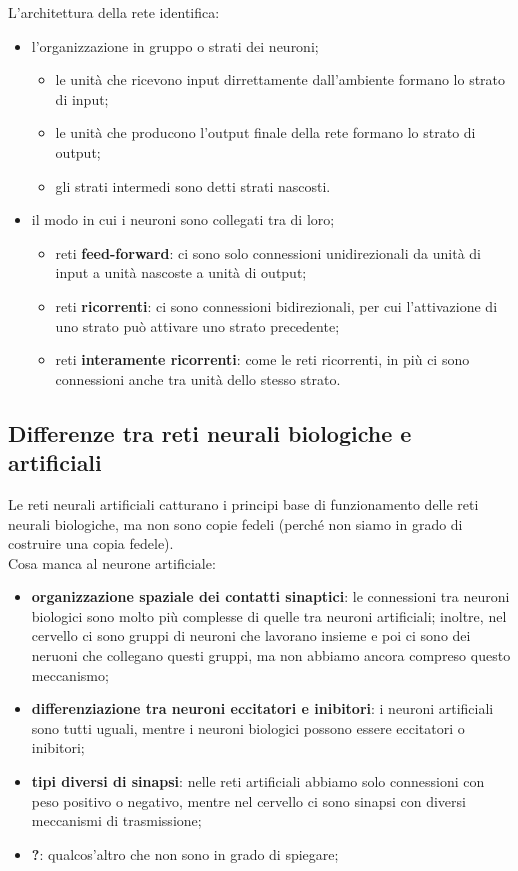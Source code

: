 L'architettura della rete identifica:
\begin{itemize}
\item l'organizzazione in gruppo o strati dei neuroni;
	\begin{itemize}
		\item le unità che ricevono input dirrettamente dall'ambiente formano lo strato
		di input;
		\item le unità che producono l'output finale della rete formano lo strato di
		output;
		\item gli strati intermedi sono detti strati nascosti.
	\end{itemize}
\item il modo in cui i neuroni sono collegati tra di loro;
	\begin{itemize}
		\item reti \textbf{feed-forward}: ci sono solo connessioni 
				unidirezionali da unità di
		input a unità nascoste a unità di output;

		\item reti \textbf{ricorrenti}: ci sono connessioni bidirezionali, per 
			cui l'attivazione di uno strato può attivare uno strato precedente;

		\item reti \textbf{interamente ricorrenti}: come le reti ricorrenti, in 
			più ci sono connessioni anche tra unità dello stesso strato.
	\end{itemize}
\end{itemize}

\subsection{Differenze tra reti neurali biologiche e artificiali}

Le reti neurali artificiali catturano i principi base di funzionamento delle
reti neurali biologiche, ma non sono copie fedeli (perché non siamo in grado di
costruire una copia fedele).\\
Cosa manca al neurone artificiale:
\begin{itemize}
	\item \textbf{organizzazione spaziale dei contatti sinaptici}: le 
		connessioni tra neuroni
		biologici sono molto più complesse di quelle tra neuroni artificiali; 
		inoltre,
		nel cervello ci sono gruppi di neuroni che lavorano insieme e poi ci 
		sono dei
		neruoni che collegano questi gruppi, ma non abbiamo ancora compreso 
		questo meccanismo;

	\item \textbf{differenziazione tra neuroni eccitatori e inibitori}: i 
		neuroni artificiali
		sono tutti uguali, mentre i neuroni biologici possono essere eccitatori 
		o inibitori;

	\item \textbf{tipi diversi di sinapsi}: nelle reti artificiali abbiamo solo 
		connessioni con peso positivo o negativo, mentre nel cervello ci sono 
		sinapsi con diversi meccanismi di trasmissione;

	\item \textbf{?}: qualcos'altro che non sono in grado di spiegare;
\end{itemize}

